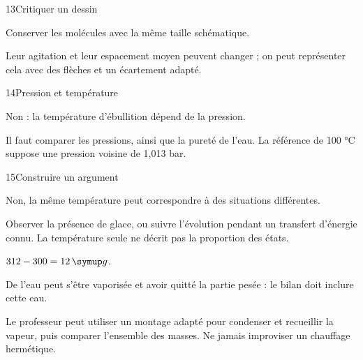 \par\noindent\begin{minipage}{\linewidth}
\begin{corrige}{13}{Critiquer un dessin}
\begin{questions}
\item Conserver les molécules avec la même taille schématique.
\item Leur agitation et leur espacement moyen peuvent changer ; on peut représenter cela avec des flèches et un écartement adapté.
\end{questions}
\end{corrige}
\end{minipage}
\par\noindent\begin{minipage}{\linewidth}
\begin{corrige}{14}{Pression et température}
\begin{questions}
\item Non : la température d’ébullition dépend de la pression.
\item Il faut comparer les pressions, ainsi que la pureté de l’eau. La référence de 100 °C suppose une pression voisine de 1,013 bar.
\end{questions}
\end{corrige}
\end{minipage}
\par\noindent\begin{minipage}{\linewidth}
\begin{corrige}{15}{Construire un argument}
\begin{questions}
\item Non, la même température peut correspondre à des situations différentes.
\item Observer la présence de glace, ou suivre l’évolution pendant un transfert d’énergie connu. La température seule ne décrit pas la proportion des états.
\end{questions}
\end{corrige}
\end{minipage}
\par\noindent\begin{minipage}{\linewidth}
\label{cor-defi-3}\begin{questions}
\item $312-300=12\unite g$.
\item De l’eau peut s’être vaporisée et avoir quitté la partie pesée : le bilan doit inclure cette eau.
\item Le professeur peut utiliser un montage adapté pour condenser et recueillir la vapeur, puis comparer l’ensemble des masses. Ne jamais improviser un chauffage hermétique.
\end{questions}
\end{minipage}
